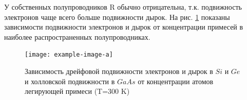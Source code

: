 У собственных полупроводников R обычно отрицательна, т.к. подвижность электронов чаще всего больше подвижности дырок. На рис. \ref{fig:9} показаны зависимости подвижности электронов и дырок от концентрации примесей в наиболее распространенных полупроводниках.

\begin{figure}[h!]
	\centering
	\texttt{[image: example-image-a]}
	\caption{Зависимость дрейфовой подвижности электронов и дырок в $Si$ и $Ge$ и холловской подвижности в $GaAs$ от концентрации атомов легирующей примеси (T=300 K)}
	\label{fig:9}
\end{figure}

% 



